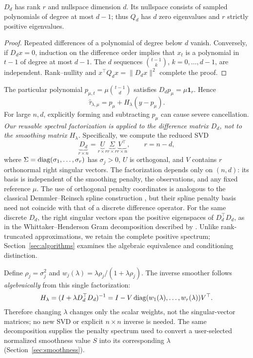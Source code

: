 \begin{lemma}\label{lem:kernel}
$D_d$ has rank $r$ and nullspace dimension $d$.
Its nullspace consists of sampled polynomials of degree at most $d-1$; thus $Q_d$ has $d$ zero eigenvalues and $r$ strictly positive eigenvalues.
\end{lemma}
\begin{proof}
Repeated differences of a polynomial of degree below $d$ vanish. Conversely, if $D_dx=0$, induction on the difference order implies that $x_t$ is a polynomial in $t-1$ of degree at most $d-1$. The $d$ sequences $\binom{t-1}{k}$, $k=0,\ldots,d-1$, are independent. Rank--nullity and $x^\top Q_dx=\|D_dx\|^2$ complete the proof.
\end{proof}

The particular polynomial $p_{\mu,t}=\mu\binom{t-1}{d}$ satisfies $D_dp_\mu=\mu\mathbf1_r$. Hence
\begin{equation}\label{eq:affine}
\widehat\tau_{\lambda,\mu}=p_\mu+H_\lambda(y-p_\mu).
\end{equation}
For large $n,d$, explicitly forming and subtracting $p_\mu$ can
cause severe cancellation. \emph{Our reusable spectral factorization is
applied to the difference matrix $D_d$, not to the smoothing matrix
$H_\lambda$.} Specifically, we compute the reduced SVD
\begin{equation}\label{eq:svd-target}
\underbrace{D_d}_{r\times n}
=\underbrace{U}_{r\times r}
\underbrace{\Sigma}_{r\times r}
\underbrace{V^\top}_{r\times n},
\qquad r=n-d,
\end{equation}
where $\Sigma=\operatorname{diag}(\sigma_1,\ldots,\sigma_r)$ has
$\sigma_j>0$, $U$ is orthogonal, and $V$ contains $r$
orthonormal right singular vectors.  The factorization
depends only on $(n,d)$: its basis is independent of
the smoothing penalty, the observations, and any
fixed reference $\mu$.
The use of orthogonal penalty coordinates is analogous to
the classical Demmler--Reinsch spline construction
\citep{demmler1975}, but their spline penalty basis need
not coincide with that of a discrete difference operator.
For the same discrete $D_d$, the right singular vectors
span the positive eigenspaces of $D_d^\top D_d$, as in
the Whittaker--Henderson Gram decomposition described by
\citet[Sec.~6.4]{biessy2026}.  Unlike rank-truncated
approximations, we retain the complete positive
spectrum; Section~\ref{sec:algorithms} examines the
algebraic equivalence and conditioning distinction.

Define $\rho_j=\sigma_j^2$ and
$w_j(\lambda)=\lambda\rho_j/(1+\lambda\rho_j)$.
The inverse smoother follows \emph{algebraically} from this
single factorization:
\begin{equation}\label{eq:svd-generated-smoother}
H_\lambda=(I+\lambda D_d^\top D_d)^{-1}
=I-V\operatorname{diag}(w_1(\lambda),\ldots,w_r(\lambda))V^\top.
\end{equation}
Therefore changing $\lambda$ changes only the scalar weights,
not the singular-vector matrices; no new SVD or explicit
$n\times n$ inverse is needed. The same decomposition supplies
the penalty spectrum used to convert a user-selected normalized
smoothness value $S$ into its corresponding $\lambda$
(Section~\ref{sec:smoothness}).

